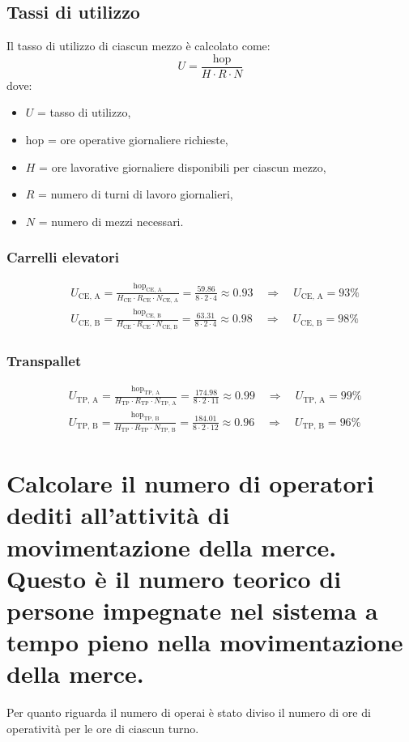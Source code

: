 \documentclass[a4paper,12pt]{article}
\begin{document}
\subsection{Tassi di utilizzo}
Il tasso di utilizzo di ciascun mezzo è calcolato come:
\begin{equation*}
  U = \frac{\text{hop}}{H \cdot R \cdot N}
\end{equation*}
dove:
\begin{itemize}
  \item $U$ = tasso di utilizzo,
  \item $\text{hop}$ = ore operative giornaliere richieste,
  \item $H$ = ore lavorative giornaliere disponibili per ciascun mezzo,
  \item $R$ = numero di turni di lavoro giornalieri,
  \item $N$ = numero di mezzi necessari.
\end{itemize}
\subsubsection{Carrelli elevatori}
\begin{align*}
  &U_{\text{CE, A}} = \frac{\text{hop}_{\text{CE, A}}}{H_{\text{CE}} \cdot R_{\text{CE}} \cdot N_{\text{CE, A}}} = \frac{59.86}{8 \cdot 2 \cdot 4} \approx 0.93 \quad \Rightarrow \quad U_{\text{CE, A}} = 93\% \\
  &U_{\text{CE, B}} = \frac{\text{hop}_{\text{CE, B}}}{H_{\text{CE}} \cdot R_{\text{CE}} \cdot N_{\text{CE, B}}} = \frac{63.31}{8 \cdot 2 \cdot 4} \approx 0.98 \quad \Rightarrow \quad U_{\text{CE, B}} = 98\%
\end{align*}
\subsubsection{Transpallet}
\begin{align*}
  &U_{\text{TP, A}} = \frac{\text{hop}_{\text{TP, A}}}{H_{\text{TP}} \cdot R_{\text{TP}} \cdot N_{\text{TP, A}}} = \frac{174.98}{8 \cdot 2 \cdot 11} \approx 0.99 \quad \Rightarrow \quad U_{\text{TP, A}} = 99\% \\
  &U_{\text{TP, B}} = \frac{\text{hop}_{\text{TP, B}}}{H_{\text{TP}} \cdot R_{\text{TP}} \cdot N_{\text{TP, B}}} = \frac{184.01}{8 \cdot 2 \cdot 12} \approx 0.96 \quad \Rightarrow \quad U_{\text{TP, B}} = 96\%
\end{align*}
\section{Calcolare il numero di operatori dediti all’attività di movimentazione della merce. Questo è il numero teorico di persone impegnate nel sistema a tempo pieno nella movimentazione della merce.}
Per quanto riguarda il numero di operai è stato diviso il numero di ore di operatività per le ore di ciascun turno.
\end{document}
